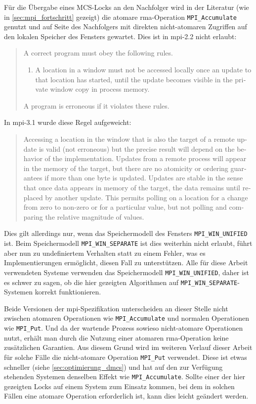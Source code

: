 Für die Übergabe eines MCS-Locks an den Nachfolger wird in der Literatur
(wie in \autoref{sec:mpi_fortschritt} gezeigt)
die atomare \gls{rma}-Operation \texttt{MPI\_Accumulate} genutzt
und auf Seite des Nachfolgers mit direkten nicht-atomaren Zugriffen auf den lokalen Speicher des \gls{Fenster}s gewartet.
Dies ist in \gls{mpi}-2.2 nicht erlaubt:
\foreignblockcquote{english}[Kapitel 11.7, S. 365]{MPI-2.2}{%
    A correct program must obey the following rules.
    \begin{enumerate}
        \item A location in a window must not be accessed locally once an update to that location
              has started, until the update becomes visible in the private window copy in process
              memory. \textelp{}
    \end{enumerate}
    A program is erroneous if it violates these rules.}
In \gls{mpi}-3.1 wurde diese Regel aufgeweicht:
\foreignblockcquote{english}[Kapitel 11.7, S. 455]{MPI-3.1}{%
    Accessing a location in the window that is also the target of a remote update is valid
    (not erroneous) but the precise result will depend on the behavior of the implementation.
    Updates from a remote process will appear in the memory of the target, but
    there are no atomicity or ordering guarantees if more than one byte is updated.
    Updates are stable in the sense that once data appears in memory of the target, the data
    remains until replaced by another update. This permits polling on a location for a
    change from zero to non-zero or for a particular value, but not polling and comparing
    the relative magnitude of values.}
Dies gilt allerdings nur,
wenn das Speichermodell des \gls{Fenster}s \texttt{MPI\_WIN\_UNIFIED} ist.
Beim Speichermodell \texttt{MPI\_WIN\_SEPARATE} ist dies weiterhin nicht erlaubt,
führt aber nun zu undefiniertem Verhalten
statt zu einem Fehler,
was es Implementierungen ermöglicht,
diesen Fall zu unterstützen.
Alle für diese Arbeit verwendeten Systeme verwenden das Speichermodell \texttt{MPI\_WIN\_UNIFIED},
daher ist es schwer zu sagen,
ob die hier gezeigten Algorithmen auf \texttt{MPI\_WIN\_SEPARATE}-Systemen korrekt funktionieren.

Beide Versionen der \gls{mpi}-Spezifikation unterscheiden an dieser Stelle nicht zwischen atomaren Operationen wie \texttt{MPI\_Accumulate}
und normalen Operationen wie \texttt{MPI\_Put}.
Und da der wartende Prozess sowieso nicht-atomare Operationen nutzt,
erhält man durch die Nutzung einer atomaren \gls{rma}-Operation keine zusätzlichen Garantien.
Aus diesem Grund wird im weiteren Verlauf dieser Arbeit für solche Fälle die nicht-atomare Operation \texttt{MPI\_Put} verwendet.
Diese ist etwas schneller (siehe \autoref{sec:optimierung_dmcs})
und hat auf den zur Verfügung stehenden Systemen denselben Effekt wie \texttt{MPI\_Accumulate}.
Sollte einer der hier gezeigten Locks auf einem System zum Einsatz kommen,
bei dem in solchen Fällen eine atomare Operation erforderlich ist,
kann dies leicht geändert werden.

